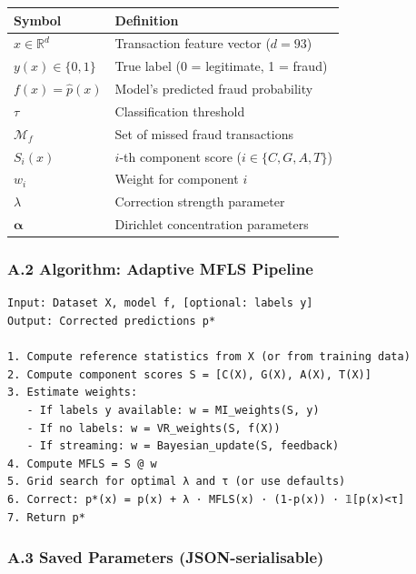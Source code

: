 \documentclass[
  11pt,
]{article}
\newcounter{none} %
\begin{document}
{\def\LTcaptype{none} %
\begin{longtable}[]{@{}ll@{}}
\toprule\noalign{}
Symbol & Definition \\
\midrule\noalign{}
\endhead
\bottomrule\noalign{}
\endlastfoot
\(x \in \mathbb{R}^d\) & Transaction feature vector (\(d = 93\)) \\
\(y(x) \in \{0, 1\}\) & True label (0 = legitimate, 1 = fraud) \\
\(f(x) = \hat{p}(x)\) & Model’s predicted fraud probability \\
\(\tau\) & Classification threshold \\
\(\mathcal{M}_f\) & Set of missed fraud transactions \\
\(S_i(x)\) & \(i\)-th component score (\(i \in \{C, G, A, T\}\)) \\
\(w_i\) & Weight for component \(i\) \\
\(\lambda\) & Correction strength parameter \\
\(\boldsymbol{\alpha}\) & Dirichlet concentration parameters \\
\end{longtable}
}

\subsubsection{A.2 Algorithm: Adaptive MFLS
Pipeline}\label{a.2-algorithm-adaptive-mfls-pipeline}

\begin{verbatim}
Input: Dataset X, model f, [optional: labels y]
Output: Corrected predictions p*

1. Compute reference statistics from X (or from training data)
2. Compute component scores S = [C(X), G(X), A(X), T(X)]
3. Estimate weights:
   - If labels y available: w = MI_weights(S, y)
   - If no labels: w = VR_weights(S, f(X))
   - If streaming: w = Bayesian_update(S, feedback)
4. Compute MFLS = S @ w
5. Grid search for optimal λ and τ (or use defaults)
6. Correct: p*(x) = p(x) + λ · MFLS(x) · (1-p(x)) · 𝟙[p(x)<τ]
7. Return p*
\end{verbatim}

\subsubsection{A.3 Saved Parameters
(JSON-serialisable)}\label{a.3-saved-parameters-json-serialisable}
\end{document}
